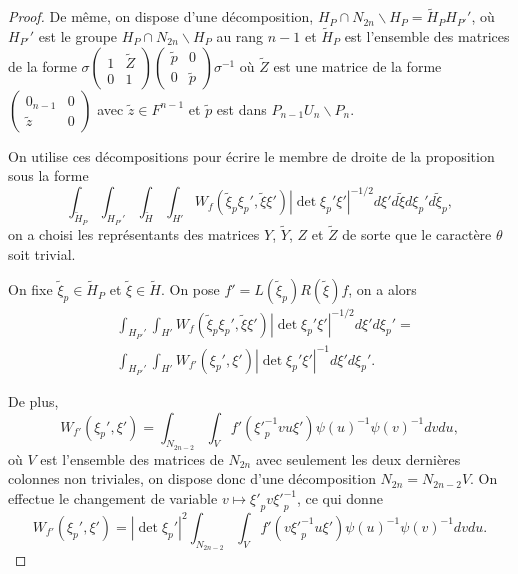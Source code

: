 \documentclass{amsart}
\begin{document}
\begin{proof}
De même, on dispose d'une décomposition, $H_P \cap N_{2n} \backslash{H_P} = \tilde{H}_P H_{P'}'$, où $H_{P'}'$ est le groupe $H_P \cap N_{2n} \backslash{H_P}$ au rang $n-1$ et $\tilde{H}_P$ est l'ensemble des matrices de la forme $\sigma \begin{pmatrix}
1 & \tilde{Z} \\
0 & 1
\end{pmatrix}\begin{pmatrix}
\tilde{p} & 0 \\
0 & \tilde{p}
\end{pmatrix} \sigma^{-1}$ où $\tilde{Z}$ est une matrice de la forme $\begin{pmatrix}
0_{n-1} & 0 \\
\tilde{z} & 0
\end{pmatrix}$ avec $\tilde{z} \in F^{n-1}$ et $\tilde{p}$ est dans $P_{n-1}U_n \backslash{P_n}$. 

On utilise ces décompositions pour écrire le membre de droite de la proposition sous la forme
\begin{equation}
\int_{\tilde{H}_P} \int_{H_{P'}'} \int_{\tilde{H}} \int_{H'} W_f(\tilde{\xi}_p\xi_p', \tilde{\xi}\xi') |\det \xi_p'\xi'|^{-1/2} d\xi' d\tilde{\xi} d\xi_p' d\tilde{\xi}_p,
\end{equation}
on a choisi les représentants des matrices $Y$, $\tilde{Y}$, $Z$ et $\tilde{Z}$ de sorte que le caractère $\theta$ soit trivial.

On fixe $\tilde{\xi}_p \in \tilde{H}_P$ et $\tilde{\xi} \in \tilde{H}$. On pose $f' = L(\tilde{\xi}_p)R(\tilde{\xi})f$, on a alors
 \begin{equation}
 \begin{split}
 & \int_{H_{P'}'} \int_{H'} W_f(\tilde{\xi}_p\xi_p', \tilde{\xi}\xi') |\det \xi_p'\xi'|^{-1/2} d\xi' d\xi_p'= \\
 & \int_{H_{P'}'} \int_{H'} W_{f'}(\xi_p', \xi') |\det \xi_p'\xi'|^{-1} d\xi' d\xi_p'.
 \end{split}
 \end{equation}

De plus,
 \begin{equation}
 W_{f'}(\xi_p', \xi') = \int_{N_{2n-2}} \int_V f'({\xi'}_p^{-1} v u \xi') \psi(u)^{-1}\psi(v)^{-1} dv du,
 \end{equation}
 où $V$ est l'ensemble des matrices de $N_{2n}$ avec seulement les deux dernières colonnes non triviales, on dispose donc d'une décomposition $N_{2n} = N_{2n-2}V$. On effectue le changement de variable $v \mapsto {\xi'}_p v {\xi'}_p^{-1}$, ce qui donne
 \begin{equation}
 W_{f'}(\xi_p', \xi') = |\det \xi_p'|^{2}\int_{N_{2n-2}} \int_V f'(v {\xi'}_p^{-1} u \xi') \psi(u)^{-1}\psi(v)^{-1} dv du.
 \end{equation}


\end{proof}
\end{document}
